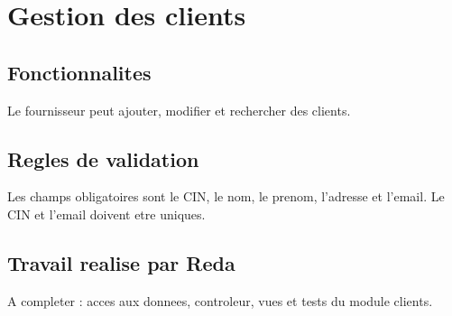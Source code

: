 \section{Gestion des clients}

\subsection{Fonctionnalites}

Le fournisseur peut ajouter, modifier et rechercher des clients.

\subsection{Regles de validation}

Les champs obligatoires sont le CIN, le nom, le prenom, l'adresse et l'email. Le CIN et l'email doivent etre uniques.

\subsection{Travail realise par Reda}

A completer : acces aux donnees, controleur, vues et tests du module clients.
